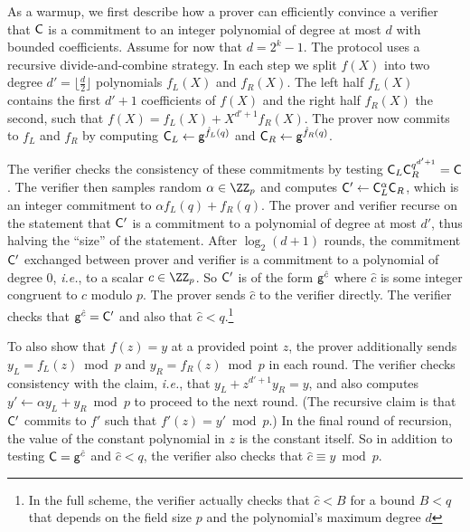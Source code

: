 As a warmup, we first describe how a prover can efficiently convince a verifier that $\mathsf{C}$ is a commitment to an integer polynomial of degree at most $d$ with bounded coefficients. Assume for now that $d=2^k-1$. The protocol uses a recursive divide-and-combine strategy. 
In each step we split $f(X)$ into two degree $d'=\lfloor\frac{d}{2}\rfloor$ polynomials $f_L(X)$ and $f_R(X)$. 
The left half $f_L(X)$ contains the first $d'+1$ coefficients of $f(X)$ and the right half $f_R(X)$ the second, such that $f(X)=f_L(X)+X^{d'+1}f_R(X)$. The prover now commits to $f_L$ and $f_R$ by computing $\mathsf{C}_L\gets \mathsf{g}^{\hat{f}_L(q)}$ and $\mathsf{C}_R\gets \mathsf{g}^{\hat{f}_R(q)}$.
\begin{comment}
In our running example, $f_L(X)=4X+1$ and $f_R(X)=2X+3$. 
\end{comment} 
The verifier checks the consistency of these commitments by testing $\mathsf{C}_L\mathsf{C}_R^{q^{d'+1}}=\mathsf{C}$. The verifier then samples random  $\alpha \in \ZZ_p$ and computes $\mathsf{C}'\gets \mathsf{C}_L^{\alpha}\mathsf{C}_R$, which is an integer commitment to $\alpha f_L(q) + f_R(q)$. The prover and verifier recurse on the statement that $\mathsf{C}'$ is a commitment to a polynomial of degree at most $d'$, thus halving the ``size'' of the statement. %
After $\log_2(d+1)$ rounds, the commitment $\mathsf{C}'$ exchanged between prover and verifier is a commitment to a polynomial of degree $0$, \emph{i.e.}, to a scalar $c \in \ZZ_p$. So $\mathsf{C}'$ is of the form $\mathsf{g}^{\hat{c}}$ where $\hat{c}$ is some integer congruent to $c$ modulo $p$. 
The prover sends $\hat{c}$ to the verifier directly. 
The verifier checks that $\mathsf{g}^{\hat{c}} = \mathsf{C}'$ and also that $\hat{c} < q$.\footnote{In the full scheme, the verifier actually checks that $\hat{c} < B$ for a bound $B < q$ that depends on the field size $p$ and the polynomial's maximum degree $d$} 

To also show that $f(z) = y$ at a provided point $z$, the prover additionally sends $y_L=f_L(z)\bmod p$ and $y_R=f_R(z)\bmod p$ in each round. The verifier checks consistency with the claim, \emph{i.e.}, that $y_L+z^{d'+1}y_R=y$, and also computes $y' \leftarrow \alpha y_L+y_R\bmod p$ to proceed to the next round. (The recursive claim is that $\mathsf{C}'$ commits to $f'$ such that $f'(z) = y' \bmod p$.) In the final round of recursion, the value of the constant polynomial in $z$ is the constant itself. So in addition to testing $\mathsf{C} = \mathsf{g}^{\hat{c}}$ and $\hat{c} < q$, the verifier also checks that $\hat{c} \equiv y \bmod p$.

